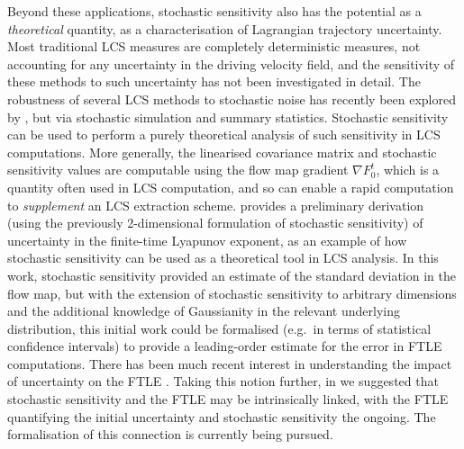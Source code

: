 Beyond these applications, stochastic sensitivity also has the potential as a \emph{theoretical} quantity, as a characterisation of Lagrangian trajectory uncertainty.
Most traditional LCS measures are completely deterministic measures, not accounting for any uncertainty in the driving velocity field, and the sensitivity of these methods to such uncertainty has not been investigated in detail.
The robustness of several LCS methods to stochastic noise has recently been explored by \citet{BadzaEtAl_2023_HowSensitiveAre}, but via stochastic simulation and summary statistics.
Stochastic sensitivity can be used to perform a purely theoretical analysis of such sensitivity in LCS computations.%
More generally, the linearised covariance matrix and stochastic sensitivity values are computable using the flow map gradient \(\nabla F_0^t\), which is a quantity often used in LCS computation, and so can enable a rapid computation to \emph{supplement} an LCS extraction scheme.%
\citet{Balasuriya_2020_UncertaintyFinitetimeLyapunov} provides a preliminary derivation (using the previously 2-dimensional formulation of stochastic sensitivity) of uncertainty in the finite-time Lyapunov exponent, as an example of how stochastic sensitivity can be used as a theoretical tool in LCS analysis.
In this work, stochastic sensitivity provided an estimate of the standard deviation in the flow map, but with the extension of stochastic sensitivity to arbitrary dimensions and the additional knowledge of Gaussianity in the relevant underlying distribution, this initial work could be formalised (e.g.\ in terms of statistical confidence intervals) to provide a leading-order estimate for the error in FTLE computations.
There has been much recent interest in understanding the impact of uncertainty on the FTLE \citep{Balasuriya_2020_UncertaintyFinitetimeLyapunov,YouLeung_2021_ComputingFiniteTime,GuoEtAl_2016_FiniteTimeLyapunovExponents}.
Taking this notion further, in  we suggested that stochastic sensitivity and the FTLE may be intrinsically linked, with the FTLE quantifying the initial uncertainty and stochastic sensitivity the ongoing.
The formalisation of this connection is currently being pursued.



